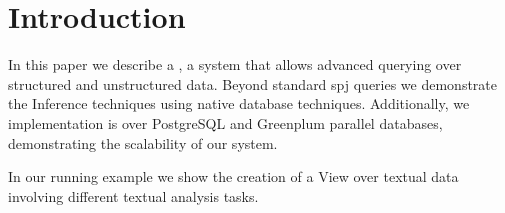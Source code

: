 
\section{Introduction}

In this paper we describe a \system, a system that allows advanced querying
over structured and unstructured data. Beyond standard spj queries we
demonstrate the Inference techniques using native database techniques.
Additionally, we implementation is over PostgreSQL and Greenplum
parallel databases, demonstrating the scalability of our system.

In our running example we show the creation of a View over textual
data involving different textual analysis tasks.



